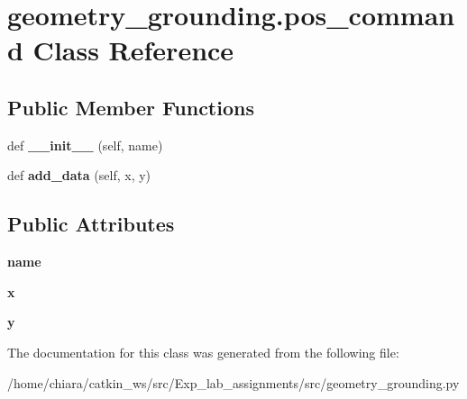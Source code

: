 \hypertarget{classgeometry__grounding_1_1pos__command}{}\section{geometry\+\_\+grounding.\+pos\+\_\+command Class Reference}
\label{classgeometry__grounding_1_1pos__command}
\subsection*{Public Member Functions}
\begin{DoxyCompactItemize}
\item 
def {\bfseries \+\_\+\+\_\+init\+\_\+\+\_\+} (self, name)\hypertarget{classgeometry__grounding_1_1pos__command_a6abb2ec9b1c726accc77d5bb253babc6}{}\label{classgeometry__grounding_1_1pos__command_a6abb2ec9b1c726accc77d5bb253babc6}

\item 
def {\bfseries add\+\_\+data} (self, x, y)\hypertarget{classgeometry__grounding_1_1pos__command_a970682d317ad80c842722945a6307217}{}\label{classgeometry__grounding_1_1pos__command_a970682d317ad80c842722945a6307217}

\end{DoxyCompactItemize}
\subsection*{Public Attributes}
\begin{DoxyCompactItemize}
\item 
{\bfseries name}\hypertarget{classgeometry__grounding_1_1pos__command_a111d281371398f9165879f4f6e806189}{}\label{classgeometry__grounding_1_1pos__command_a111d281371398f9165879f4f6e806189}

\item 
{\bfseries x}\hypertarget{classgeometry__grounding_1_1pos__command_afee0d1f75d0d144f9052dd18c4d15773}{}\label{classgeometry__grounding_1_1pos__command_afee0d1f75d0d144f9052dd18c4d15773}

\item 
{\bfseries y}\hypertarget{classgeometry__grounding_1_1pos__command_acd9cd54046f4ea7413b1ca0630d82142}{}\label{classgeometry__grounding_1_1pos__command_acd9cd54046f4ea7413b1ca0630d82142}

\end{DoxyCompactItemize}


The documentation for this class was generated from the following file\+:\begin{DoxyCompactItemize}
\item 
/home/chiara/catkin\+\_\+ws/src/\+Exp\+\_\+lab\+\_\+assignments/src/geometry\+\_\+grounding.\+py\end{DoxyCompactItemize}
